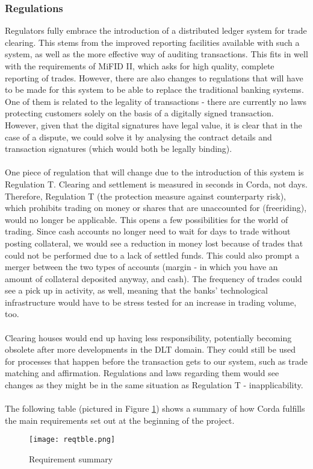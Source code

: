 \documentclass[12pt,twoside]{article}
\begin{document}
\subsubsection{Regulations}
\label{sub:reg}
Regulators fully embrace the introduction of a distributed ledger system for trade clearing. This stems from the improved reporting facilities available with such a system, as well as the more effective way of auditing transactions. This fits in well with the requirements of MiFID II, which asks for high quality, complete reporting of trades. However, there are also changes to regulations that will have to be made for this system to be able to replace the traditional banking systems. One of them is related to the legality of transactions - there are currently no laws protecting customers solely on the basis of a digitally signed transaction. However, given that the digital signatures have legal value, it is clear that in the case of a dispute, we could solve it by analysing the contract details and transaction signatures (which would both be legally binding).
\\ \\
One piece of regulation that will change due to the introduction of this system is Regulation T. Clearing and settlement is measured in seconds in Corda, not days. Therefore, Regulation T (the protection measure against counterparty risk), which prohibits trading on money or shares that are unaccounted for (freeriding), would no longer be applicable. This opens a few possibilities for the world of trading. Since cash accounts no longer need to wait for days to trade without posting collateral, we would see a reduction in money lost because of trades that could not be performed due to a lack of settled funds. This could also prompt a merger between the two types of accounts (margin - in which you have an amount of collateral deposited anyway, and cash). The frequency of trades could see a pick up in activity, as well, meaning that the banks' technological infrastructure would have to be stress tested for an increase in trading volume, too. 
\\ \\
Clearing houses would end up having less responsibility, potentially becoming obsolete after more developments in the DLT domain. They could still be used for processes that happen before the transaction gets to our system, such as trade matching and affirmation. Regulations and laws regarding them would see changes as they might be in the same situation as Regulation T - inapplicability. 
\\ \\
The following table (pictured in Figure \ref{fig:summary}) shows a summary of how Corda fulfills the main requirements set out at the beginning of the project.
\begin{figure}[!htb]
\centering
\texttt{[image: reqtble.png]}
\caption{Requirement summary}
\centering
\label{fig:summary}
\end{figure}
\newpage
\end{document}
